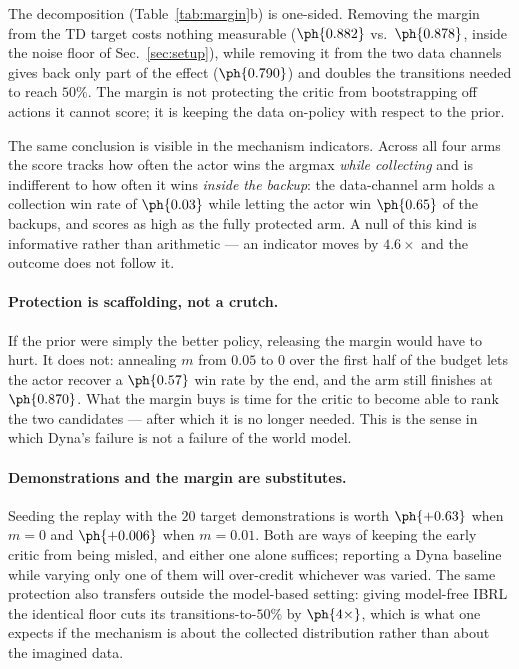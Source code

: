 The decomposition (Table~\ref{tab:margin}b) is one-sided. Removing the margin
from the TD target costs nothing measurable ($\ph{0.882}$ vs.\ $\ph{0.878}$,
inside the noise floor of Sec.~\ref{sec:setup}), while removing it from the two
data channels gives back only part of the effect ($\ph{0.790}$) and doubles the
transitions needed to reach $50\%$. The margin is not protecting the critic
from bootstrapping off actions it cannot score; it is keeping the data
on-policy with respect to the prior.

The same conclusion is visible in the mechanism indicators. Across all four
arms the score tracks how often the actor wins the argmax \emph{while
collecting} and is indifferent to how often it wins \emph{inside the backup}:
the data-channel arm holds a collection win rate of $\ph{0.03}$ while letting
the actor win $\ph{0.65}$ of the backups, and scores as high as the fully
protected arm. A null of this kind is informative rather than arithmetic --- an
indicator moves by $4.6\times$ and the outcome does not follow it.

\paragraph{Protection is scaffolding, not a crutch.}
If the prior were simply the better policy, releasing the margin would have to
hurt. It does not: annealing $m$ from $0.05$ to $0$ over the first half of the
budget lets the actor recover a $\ph{0.57}$ win rate by the end, and the arm
still finishes at $\ph{0.870}$. What the margin buys is time for the critic to
become able to rank the two candidates --- after which it is no longer needed.
This is the sense in which Dyna's failure is not a failure of the world model.

\paragraph{Demonstrations and the margin are substitutes.}
Seeding the replay with the $20$ target demonstrations is worth $\ph{+0.63}$
when $m=0$ and $\ph{+0.006}$ when $m=0.01$. Both are ways of keeping the early
critic from being misled, and either one alone suffices; reporting a Dyna
baseline while varying only one of them will over-credit whichever was varied.
The same protection also transfers outside the model-based setting: giving
model-free IBRL the identical floor cuts its transitions-to-$50\%$ by
$\ph{4\times}$, which is what one expects if the mechanism is about the
collected distribution rather than about the imagined data.

